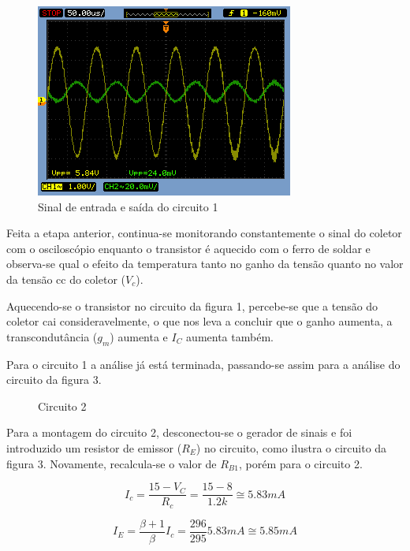 \documentclass[a4paper]{article} %
\begin{document}
\begin{figure}[h!]
\begin{centering}
\includegraphics[scale=0.5]{figuras03/1_1} \caption{Sinal de entrada e saída do circuito 1 \label{fig:11}}
\par\end{centering}
\end{figure}

Feita a etapa anterior, continua-se monitorando constantemente o sinal do coletor
com o osciloscópio enquanto o transistor é aquecido com o ferro de soldar e observa-se qual o
efeito da temperatura tanto no ganho da tensão quanto no valor da tensão cc do coletor ($V_c$).

Aquecendo-se o transistor no circuito da figura 1, percebe-se que a tensão do coletor
cai consideravelmente, o que nos leva a concluir que o ganho aumenta, a transcondutância
($g_m$) aumenta e $I_C$ aumenta também.

Para o circuito 1 a análise já está terminada, passando-se assim para a análise do
circuito da figura 3.

\vspace{3mm}
\begin{figure}[h!]
\centerline{}
\caption{Circuito 2\label{circ:2}}
\end{figure}

Para a montagem do circuito 2, desconectou-se o gerador de sinais e foi introduzido
um resistor de emissor ($R_E$) no circuito, como ilustra o circuito da figura 3. Novamente,
recalcula-se o valor de $R_{B1}$, porém para o circuito 2.

\begin{displaymath}
I_c=\frac{15-V_C}{R_c}=\frac{15-8}{1.2k}\cong5.83mA
\end{displaymath}

\begin{displaymath}
I_E=\frac{\beta +1}{\beta}I_c=\frac{296}{295}5.83mA\cong5.85mA
\end{displaymath}
\end{document}
